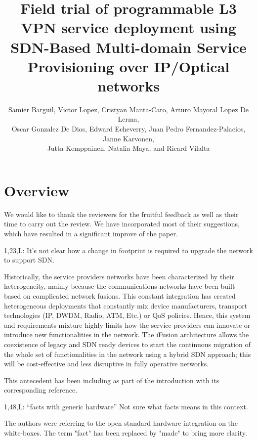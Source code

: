 \documentclass[12pt]{journalrebuttal}
\title{Field trial of programmable L3 VPN service deployment using SDN-Based Multi-domain Service Provisioning over IP/Optical networks}
\author{
Samier Barguil, Victor Lopez, Cristyan Manta-Caro, Arturo Mayoral Lopez De Lerma,\\
Oscar Gonzalez De Dios, Edward Echeverry, Juan Pedro Fernandez-Palacios, Janne Karvonen,\\
Jutta Kemppainen, Natalia Maya, and Ricard Vilalta}
\begin{document}
\maketitle

\vspace{0.5cm}
\makerule
\section*{Overview}

We would like to thank the reviewers for the fruitful feedback as well as their time to carry out the review. We have incorporated most of their suggestions, which have resulted in a significant improve of the paper.

\nextreviewer

\begin{revcomment}
1,23,L: It’s not clear how a change in footprint is required to upgrade the network to support SDN.
\end{revcomment}

\begin{response}
Historically, the service providers networks have been characterized by their heterogeneity, mainly because the communications networks have been built based on complicated network fusions. This constant integration has created heterogeneous deployments that constantly mix device manufacturers, transport technologies (IP, DWDM, Radio, ATM, Etc.) or QoS policies. Hence, this system and requirements mixture highly limits how the service providers can innovate or introduce new functionalities in the network. The iFusion architecture allows the coexistence of legacy and SDN ready devices to start the continuous migration of the whole set of functionalities in the network using a hybrid SDN approach; this will be cost-effective and less disruptive in fully operative networks.

This antecedent has been including as part of the introduction with its corresponding reference. 
\end{response}

\begin{revcomment}
1,48,L: “facts with generic hardware” Not sure what facts means in this context.
\end{revcomment}

\begin{response}
The authors were referring to the open standard hardware integration on the white-boxes. The term "fact" has been replaced by "made" to bring more clarity. 

\end{response}
\end{document}
